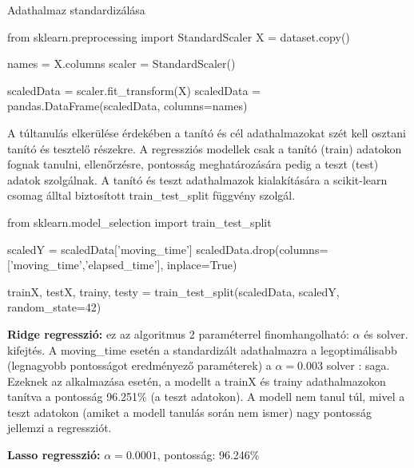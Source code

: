 \begin{programreszlet}   
Adathalmaz standardizálása

\begin{python}
from sklearn.preprocessing import StandardScaler
X = dataset.copy()

names = X.columns
scaler = StandardScaler()

scaledData = scaler.fit_transform(X)
scaledData = pandas.DataFrame(scaledData, columns=names)
\end{python}
\end{programreszlet}

\begin{programreszlet} A túltanulás elkerülése érdekében a tanító és cél adathalmazokat szét kell osztani tanító és tesztelő részekre. A regressziós modellek csak a tanító (train) adatokon fognak tanulni, ellenőrzésre, pontosság meghatározására pedig a teszt (test) adatok szolgálnak. A tanító és teszt adathalmazok kialakítására a scikit-learn csomag álltal biztosított train\_test\_split függvény szolgál.
\begin{python}
from sklearn.model_selection import train_test_split
	
scaledY = scaledData['moving_time']
scaledData.drop(columns=['moving_time','elapsed_time'], inplace=True)

trainX, testX, trainy, testy = train_test_split(scaledData, scaledY, 
						random_state=42)
\end{python}

\end{programreszlet}

\textbf{Ridge regresszió:} ez az algoritmus 2 paraméterrel finomhangolható: $\alpha$ és solver. \TODO kifejtés. A moving\_time esetén a standardizált adathalmazra a legoptimálisabb (legnagyobb pontosságot eredményező paraméterek) a $\alpha = 0.003$ solver : saga. Ezeknek az alkalmazása esetén, a modellt a trainX és trainy adathalmazokon tanítva a pontosság 96.251\% (a teszt adatokon). A modell nem tanul túl, mivel a teszt adatokon (amiket a modell tanulás során nem ismer) nagy pontosság jellemzi a regressziót.

\textbf{Lasso regresszió:} 
$\alpha = 0.0001$, pontosság: 96.246\%

